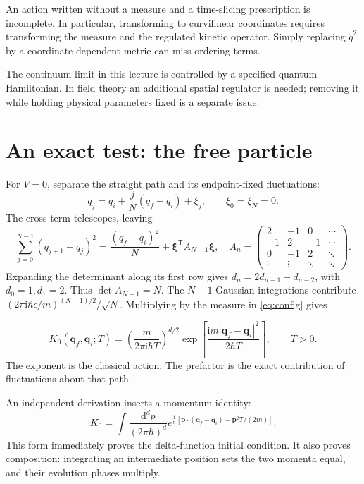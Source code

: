 \documentclass[11pt]{article}
\newcommand{\dd}{\mathrm d}
\newcommand{\ii}{\mathrm i}
\newcommand{\module}[1]{\clearpage\section{#1}}
\begin{document}
\begin{keyidea}
An action written without a measure and a time-slicing prescription is
incomplete. In particular, transforming to curvilinear coordinates
requires transforming the measure and the regulated kinetic operator.
Simply replacing \(\dot q^2\) by a coordinate-dependent metric can miss
ordering terms.
\end{keyidea}
The continuum limit in this lecture is controlled by a specified quantum
Hamiltonian. In field theory an additional spatial regulator is needed;
removing it while holding physical parameters fixed is a separate issue.

\module{An exact test: the free particle}
For \(V=0\), separate the straight path and its endpoint-fixed fluctuations:
\begin{equation}
 q_j=q_i+\frac jN(q_f-q_i)+\xi_j,\qquad\xi_0=\xi_N=0.
\end{equation}
The cross term telescopes, leaving
\begin{equation}
 \sum_{j=0}^{N-1}(q_{j+1}-q_j)^2
 =\frac{(q_f-q_i)^2}{N}+\bm\xi^{\mathsf T}A_{N-1}\bm\xi,
 \quad
 A_n=\begin{pmatrix}
 2&-1&0&\cdots\\-1&2&-1&\cdots\\0&-1&2&\ddots\\
 \vdots&\vdots&\ddots&\ddots
 \end{pmatrix}.
\end{equation}
Expanding the determinant along its first row gives
\(d_n=2d_{n-1}-d_{n-2}\), with \(d_0=1,d_1=2\).
Thus \(\det A_{N-1}=N\). The \(N-1\) Gaussian integrations contribute
\((2\pi\ii\hbar\epsilon/m)^{(N-1)/2}/\sqrt N\).
Multiplying by the measure in \eqref{eq:config} gives
\begin{keyidea}
\begin{equation}
 K_0(\bm q_f,\bm q_i;T)=
 \left(\frac{m}{2\pi\ii\hbar T}\right)^{d/2}
 \exp\!\left[\frac{\ii m|\bm q_f-\bm q_i|^2}{2\hbar T}\right],
 \qquad T>0.                                         \label{eq:free}
\end{equation}
The exponent is the classical action. The prefactor is the exact
contribution of fluctuations about that path.
\end{keyidea}

An independent derivation inserts a momentum identity:
\begin{equation}
 K_0=\int\frac{\dd^d p}{(2\pi\hbar)^d}
 e^{\frac{\ii}{\hbar}[\bm p\cdot(\bm q_f-\bm q_i)-\bm p^2T/(2m)]}.
                                                        \label{eq:freefourier}
\end{equation}
This form immediately proves the delta-function initial condition.
It also proves composition: integrating an intermediate position sets
the two momenta equal, and their evolution phases multiply.
\end{document}
